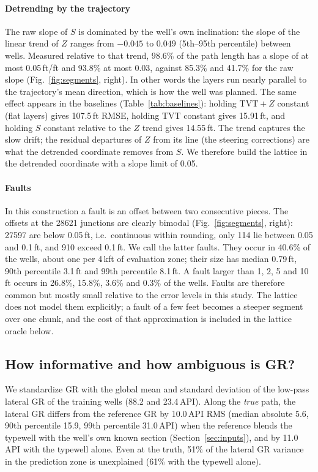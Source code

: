 \documentclass[preprint,12pt,authoryear]{elsarticle}
\newcommand{\Sv}{S}
\newcommand{\TVT}{\mathrm{TVT}}
\begin{document}
\paragraph{Detrending by the trajectory}
The raw slope of $\Sv$ is dominated by the well's own inclination: the slope of the linear trend of $Z$ ranges from $-0.045$ to $0.049$ (5th--95th percentile) between wells. Measured relative to that trend, 98.6\% of the path length has a slope of at most 0.05\,ft/ft and 93.8\% at most 0.03, against 85.3\% and 41.7\% for the raw slope (Fig.~\ref{fig:segments}, right). In other words the layers run nearly parallel to the trajectory's mean direction, which is how the well was planned. The same effect appears in the baselines (Table~\ref{tab:baselines}): holding $\TVT+Z$ constant (flat layers) gives 107.5\,ft RMSE, holding TVT constant gives 15.91\,ft, and holding $\Sv$ constant relative to the $Z$ trend gives 14.55\,ft. The trend captures the slow drift; the residual departures of $Z$ from its line (the steering corrections) are what the detrended coordinate removes from $\Sv$. We therefore build the lattice in the detrended coordinate with a slope limit of 0.05.

\paragraph{Faults}
In this construction a fault is an offset between two consecutive pieces. The offsets at the \num{28621} junctions are clearly bimodal (Fig.~\ref{fig:segments}, right): \num{27597} are below 0.05\,ft, i.e.\ continuous within rounding, only 114 lie between 0.05 and 0.1\,ft, and 910 exceed 0.1\,ft. We call the latter faults. They occur in 40.6\% of the wells, about one per 4\,kft of evaluation zone; their size has median 0.79\,ft, 90th percentile 3.1\,ft and 99th percentile 8.1\,ft. A fault larger than 1, 2, 5 and 10\,ft occurs in 26.8\%, 15.8\%, 3.6\% and 0.3\% of the wells. Faults are therefore common but mostly small relative to the error levels in this study. The lattice does not model them explicitly; a fault of a few feet becomes a steeper segment over one chunk, and the cost of that approximation is included in the lattice oracle below.

\subsection{How informative and how ambiguous is GR?}\label{sec:gr}
We standardize GR with the global mean and standard deviation of the low-pass lateral GR of the training wells (88.2 and 23.4\,API). Along the \emph{true} path, the lateral GR differs from the reference GR by 10.0\,API RMS (median absolute 5.6, 90th percentile 15.9, 99th percentile 31.0\,API) when the reference blends the typewell with the well's own known section (Section~\ref{sec:inputs}), and by 11.0\,API with the typewell alone. Even at the truth, 51\% of the lateral GR variance in the prediction zone is unexplained (61\% with the typewell alone).
\end{document}
